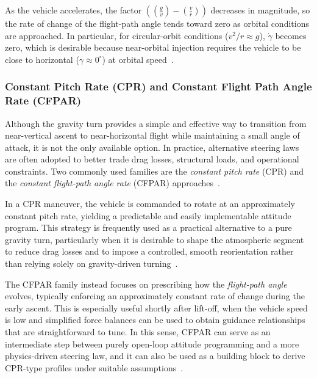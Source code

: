 As the vehicle accelerates, the factor $\left((\frac{g}{v})-(\frac{v}{r})\right)$ decreases in magnitude, so the rate of change of the flight-path angle tends toward zero as orbital conditions are approached. In particular, for circular-orbit conditions ($v^2/r \approx g$), $\dot{\gamma}$ becomes zero, which is desirable because near-orbital injection requires the vehicle to be close to horizontal ($\gamma \approx 0^\circ$) at orbital speed~\cite{Edberg}.


\subsubsection{Constant Pitch Rate (CPR) and Constant Flight Path Angle Rate (CFPAR)}

Although the gravity turn provides a simple and effective way to transition from near-vertical ascent to near-horizontal flight while maintaining a small angle of attack, it is not the only available option. In practice, alternative steering laws are often adopted to better trade drag losses, structural loads, and operational constraints. Two commonly used families are the \emph{constant pitch rate} (CPR) and the \emph{constant flight-path angle rate} (CFPAR) approaches~\cite{Ulrich}.

In a CPR maneuver, the vehicle is commanded to rotate at an approximately constant pitch rate, yielding a predictable and easily implementable attitude program. This strategy is frequently used as a practical alternative to a pure gravity turn, particularly when it is desirable to shape the atmospheric segment to reduce drag losses and to impose a controlled, smooth reorientation rather than relying solely on gravity-driven turning~\cite{Ulrich}.

The CFPAR family instead focuses on prescribing how the \emph{flight-path angle} evolves, typically enforcing an approximately constant rate of change during the early ascent. This is especially useful shortly after lift-off, when the vehicle speed is low and simplified force balances can be used to obtain guidance relationships that are straightforward to tune. In this sense, CFPAR can serve as an intermediate step between purely open-loop attitude programming and a more physics-driven steering law, and it can also be used as a building block to derive CPR-type profiles under suitable assumptions~\cite{Ulrich}.


